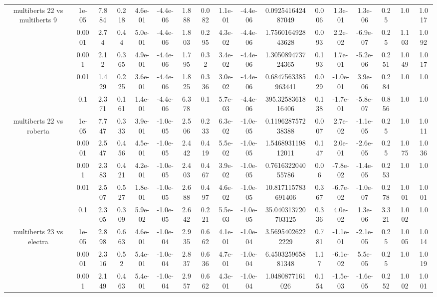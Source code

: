 \begin{tabular}{|c|c|c|c|c|c|c|c|c|c|c|c|c|c|c|c|c|}
\hline
\multirow{5}{*}{multiberts 22 vs multiberts 9} & 1e-05 & 7.884 & 0.218 & 4.6e-01 & -4.4e-06 & 1.888 & 0.082 & 1.1e-01 & -4.4e-06 & 0.092541642487049 & 0.006 & 1.3e-01 & 1.3e-06 & 0.25 & 1.0 & 1.017 \\
 & 0.0001 & 2.74 & 0.44 & 5.0e-01 & -4.4e-06 & 1.803 & 0.295 & 4.3e-02 & -4.4e-06 & 1.756016492843628 & 0.093 & 2.2e-02 & -6.9e-07 & 0.25 & 1.103 & 1.092 \\
 & 0.001 & 2.12 & 0.365 & 4.9e-01 & -4.4e-06 & 1.795 & 0.32 & 3.4e-02 & -4.4e-06 & 1.305089473724365 & 0.193 & 1.7e-01 & -5.2e-06 & 0.251 & 1.049 & 1.017 \\
 & 0.01 & 1.429 & 0.225 & 3.6e-01 & -4.4e-06 & 1.825 & 0.336 & 3.0e-02 & -4.4e-06 & 0.6847563385963441 & 0.029 & -1.0e-01 & 3.9e-06 & 0.284 & 1.0 & 1.0 \\
 & 0.1 & 2.371 & 0.161 & 1.4e-01 & -4.4e-06 & 6.378 & 0.1 & 5.7e-03 & -4.4e-06 & 395.3258361816406 & 0.138 & -1.7e-01 & -5.8e-07 & 0.856 & 1.0 & 1.0 \\
\hline
\multirow{5}{*}{multiberts 22 vs roberta } & 1e-05 & 7.747 & 0.333 & 3.9e-01 & -1.0e-05 & 2.506 & 0.233 & 6.3e-02 & -1.0e-05 & 0.119628757238388 & 0.007 & 2.7e-02 & -1.1e-05 & 0.25 & 1.0 & 1.011 \\
 & 0.0001 & 2.547 & 0.456 & 4.5e-01 & -1.0e-05 & 2.442 & 0.419 & 5.5e-02 & -1.0e-05 & 1.546893119812011 & 0.147 & 2.0e-01 & -2.6e-05 & 0.25 & 1.075 & 1.036 \\
 & 0.001 & 2.383 & 0.421 & 4.2e-01 & -1.0e-05 & 2.403 & 0.467 & 3.9e-02 & -1.0e-05 & 0.761632204055786 & 0.06 & -7.8e-02 & -1.4e-05 & 0.253 & 1.0 & 1.0 \\
 & 0.01 & 2.507 & 0.527 & 1.8e-01 & -1.0e-05 & 2.688 & 0.497 & 4.6e-02 & -1.0e-05 & 10.817115783691406 & 0.367 & -6.7e-02 & -1.0e-07 & 0.278 & 1.001 & 1.001 \\
 & 0.1 & 2.305 & 0.309 & 5.9e-02 & -1.0e-05 & 2.642 & 0.221 & 5.5e-03 & -1.0e-05 & 35.040313720703125 & 0.336 & 4.0e-02 & 1.3e-06 & 3.321 & 1.002 & 1.0 \\
\hline
\multirow{5}{*}{multiberts 23 vs electra } & 1e-05 & 2.898 & 0.663 & 4.6e-01 & -1.0e-04 & 2.935 & 0.662 & 4.1e-01 & -1.0e-04 & 3.56954026222229 & 0.781 & -1.1e-01 & -2.1e-05 & 0.25 & 1.005 & 1.014 \\
 & 0.0001 & 2.316 & 0.52 & 5.4e-01 & -1.0e-04 & 2.837 & 0.636 & 4.7e-01 & -1.0e-04 & 6.450325965881348 & 1.17 & -6.1e-02 & 5.5e-05 & 0.25 & 1.0 & 1.019 \\
 & 0.001 & 2.149 & 0.463 & 5.4e-01 & -1.0e-04 & 2.957 & 0.662 & 4.3e-01 & -1.0e-04 & 1.0480877161026 & 0.154 & -1.5e-03 & -1.6e-05 & 0.252 & 1.002 & 1.001 \\

\end{tabular}
